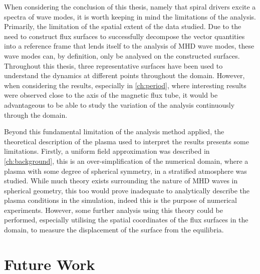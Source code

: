 When considering the conclusion of this thesis, namely that spiral drivers excite a spectra of wave modes, it is worth keeping in mind the limitations of the analysis.
Primarily, the limitation of the spatial extent of the data studied.
Due to the need to construct flux surfaces to successfully decompose the vector quantities into a reference frame that lends itself to the analysis of MHD wave modes, these wave modes can, by definition, only be analysed on the constructed surfaces.
Throughout this thesis, three representative surfaces have been used to understand the dynamics at different points throughout the domain.
However, when considering the results, especially in \cref{ch:period}, where interesting results were observed close to the axis of the magnetic flux tube, it would be advantageous to be able to study the variation of the analysis continuously through the domain.

Beyond this fundamental limitation of the analysis method applied, the theoretical description of the plasma used to interpret the results presents some limitations.
Firstly, a uniform field approximation was described in \cref{ch:background}, this is an over-simplification of the numerical domain, where a plasma with some degree of spherical symmetry, in a stratified atmosphere was studied.
While much theory exists surrounding the nature of MHD waves in spherical geometry, this too would prove inadequate to analytically describe the plasma conditions in the simulation, indeed this is the purpose of numerical experiments.
However, some further analysis using this theory could be performed, especially utilising the spatial coordinates of the flux surfaces in the domain, to measure the displacement of the surface from the equilibria.

\section{Future Work}

